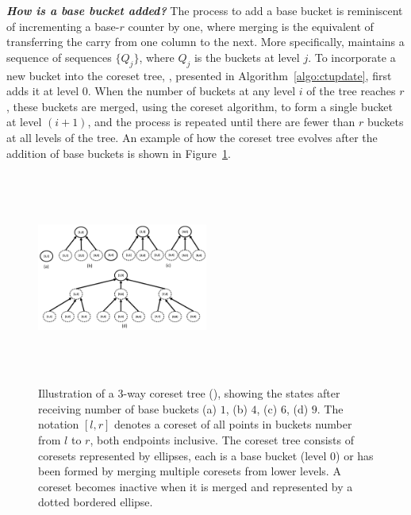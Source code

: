 \noindent{}\emph{\textbf{How is a base bucket added?}}
The process to add a base bucket is reminiscent of incrementing a base-$r$
counter by one, where merging is the equivalent of transferring the carry from
one column to the next.  More specifically, \ct maintains a sequence of
sequences $\{Q_j\}$, where $Q_j$ is the buckets at level $j$. To incorporate a
new bucket into the coreset tree, \ctupdate{}, presented in
Algorithm~\ref{algo:ctupdate}, first adds it at level $0$. When the number of
buckets at any level $i$ of the tree reaches $r$, these buckets are merged,
using the coreset algorithm, to form a single bucket at level $(i+1)$, and the
process is repeated until there are fewer than $r$ buckets at all levels of the
tree. An example of how the coreset tree evolves after the addition of base buckets 
is shown in Figure~\ref{fig:coreset-tree}.

\begin{figure}
  \includegraphics[width=0.5\textwidth, height=7cm]{figs/coreset-tree.pdf}
  \caption{Illustration of a $3$-way coreset tree (\ct), showing the states after receiving number of base buckets 
  (a) $1$, (b) $4$, (c) $6$, (d) $9$. The notation $[l,r]$ denotes a coreset of all points in buckets number from $l$ to $r$, both endpoints inclusive. The coreset tree consists of coresets represented by ellipses, each is a base bucket (level $0$) or has been formed by merging multiple coresets from lower levels. A coreset becomes inactive when it is merged and represented by a dotted bordered ellipse.}
\label{fig:coreset-tree}
\end{figure}



